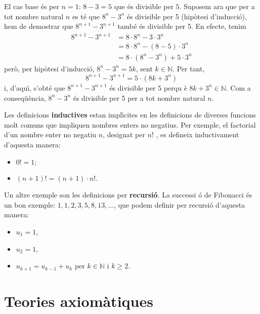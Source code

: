 \begin{solucio}
El cas base \'{e}s per $n=1$: $8-3=5$ que \'{e}s divisible per $5$. Suposem
ara que per a tot nombre natural $n$ es t\'{e} que $8^{n}-3^{n}$ \'{e}s
divisible per 5 (hip\`{o}tesi d'inducci\'{o}), hem de demostrar que $%
8^{n+1}-3^{n+1}$ tamb\'{e} \'{e}s divisible per 5. En efecte, tenim%
\begin{align*}
8^{n+1}-3^{n+1} & =8\cdot8^{n}-3\cdot3^{n} \\
& =8\cdot8^{n}-\left( 8-5\right) \cdot3^{n} \\
& =8\cdot\left( 8^{n}-3^{n}\right) +5\cdot3^{n}
\end{align*}
per\`{o}, per hip\`{o}tesi d'inducci\'{o}, $8^{n}-3^{n}=5k$, sent $k\in%
\mathbb{N}$. Per tant,%
\begin{equation*}
8^{n+1}-3^{n+1}=5\cdot\left( 8k+3^{n}\right)
\end{equation*}
i, d'aqu\'{\i}, s'obt\'{e} que $8^{n+1}-3^{n+1}$ \'{e}s divisible per 5 perqu%
\`{e} $8k+3^{n}\in\mathbb{N}$. Com a conseq\"{u}\`{e}ncia, $8^{n}-3^{n}$
\'{e}s divisible per 5 per a tot nombre natural $n$.
\end{solucio}

Les definicions \textbf{inductives} estan impl\'{\i}cites en les definicions
de diverses funcions molt comuns que impliquen nombres enters no negatius.
Per exemple, el factorial d'un nombre enter no negatiu $n$, designat per $n!$%
, es defineix inductivament d'aquesta manera:

\begin{itemize}
\item $0!=1;$

\item $\left( n+1\right) !=\left( n+1\right) \cdot n!$.
\end{itemize}

Un altre exemple son les definicions per \textbf{recursi\'{o}}. La successi%
\'{o} de Fibonacci \'{e}s un bon exemple: $1,1,2,3,5,8,13,...$, que podem
definir per recursi\'{o} d'aquesta manera:

\begin{itemize}
\item $u_{1}=1$,

\item $u_{2}=1$,

\item $u_{k+1}=u_{k-1}+u_{k}$ per $k\in\mathbb{N}$ i $k\geq2$.
\end{itemize}

\section{Teories axiom\`{a}tiques}

